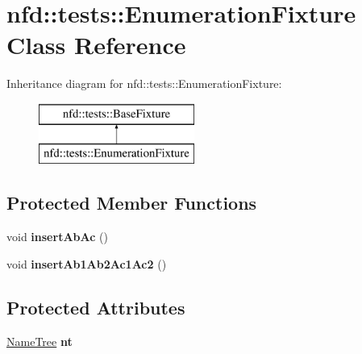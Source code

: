 \hypertarget{classnfd_1_1tests_1_1EnumerationFixture}{}\section{nfd\+:\+:tests\+:\+:Enumeration\+Fixture Class Reference}
\label{classnfd_1_1tests_1_1EnumerationFixture}
Inheritance diagram for nfd\+:\+:tests\+:\+:Enumeration\+Fixture\+:\begin{figure}[H]
\begin{center}
\leavevmode
\includegraphics[height=2.000000cm]{classnfd_1_1tests_1_1EnumerationFixture}
\end{center}
\end{figure}
\subsection*{Protected Member Functions}
\begin{DoxyCompactItemize}
\item 
void {\bfseries insert\+Ab\+Ac} ()\hypertarget{classnfd_1_1tests_1_1EnumerationFixture_a7f0e56031ba9abfb50ce610c1a3db116}{}\label{classnfd_1_1tests_1_1EnumerationFixture_a7f0e56031ba9abfb50ce610c1a3db116}

\item 
void {\bfseries insert\+Ab1\+Ab2\+Ac1\+Ac2} ()\hypertarget{classnfd_1_1tests_1_1EnumerationFixture_a8c9c774c4722171721234a21412247ea}{}\label{classnfd_1_1tests_1_1EnumerationFixture_a8c9c774c4722171721234a21412247ea}

\end{DoxyCompactItemize}
\subsection*{Protected Attributes}
\begin{DoxyCompactItemize}
\item 
\hyperlink{classnfd_1_1NameTree}{Name\+Tree} {\bfseries nt}\hypertarget{classnfd_1_1tests_1_1EnumerationFixture_a4bf9f9dd272789d1a61bcb75bad05daa}{}\label{classnfd_1_1tests_1_1EnumerationFixture_a4bf9f9dd272789d1a61bcb75bad05daa}

\end{DoxyCompactItemize}
